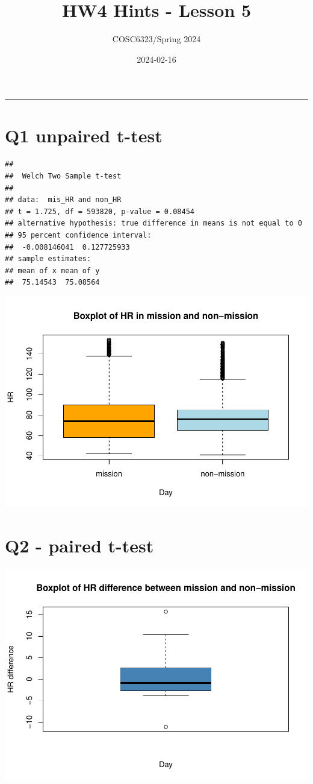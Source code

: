 \documentclass[
]{article}
\title{HW4 Hints - Lesson 5}
\author{COSC6323/Spring 2024}
\date{2024-02-16}
\begin{document}
\maketitle

\begin{center}\rule{0.5\linewidth}{0.5pt}\end{center}

\newpage

\section{Q1 unpaired t-test}\label{q1-unpaired-t-test}

\begin{verbatim}
## 
##  Welch Two Sample t-test
## 
## data:  mis_HR and non_HR
## t = 1.725, df = 593820, p-value = 0.08454
## alternative hypothesis: true difference in means is not equal to 0
## 95 percent confidence interval:
##  -0.008146041  0.127725933
## sample estimates:
## mean of x mean of y 
##  75.14543  75.08564
\end{verbatim}

\includegraphics{HW4-Hints_files/figure-latex/unnamed-chunk-14-1.pdf}

\section{Q2 - paired t-test}\label{q2---paired-t-test}

\includegraphics{HW4-Hints_files/figure-latex/unnamed-chunk-16-1.pdf}
\end{document}

